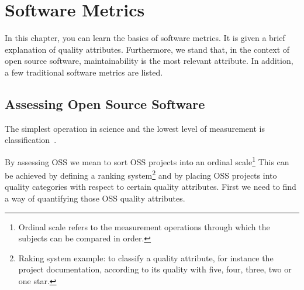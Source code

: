 \thispagestyle{empty}
\chapter{Software Metrics}\label{chap:software_metrics}

In this chapter, you can learn the basics of software metrics. 
It is given a brief explanation of quality attributes. Furthermore, we stand that, in the context of open source software, maintainability is the most relevant attribute. In addition, a few traditional software metrics are listed.


\section{Assessing Open Source Software} \label{sec:assessing}
The simplest operation in science and the lowest level of measurement is classification~\cite{kan2002metrics}.

By assessing OSS we mean to sort OSS projects into an
\textsf{ordinal scale}\footnote{Ordinal scale refers to the measurement operations through which the subjects can be compared in order.}
This can be achieved by defining a
\textsf{ranking system}\footnote{
  Raking system example: to classify a quality attribute, for instance the project documentation, according to its quality with
  five, four, three, two or one star.
} and by placing OSS projects into quality categories with respect to certain quality attributes.
First we need to find a way of quantifying those OSS quality attributes.

